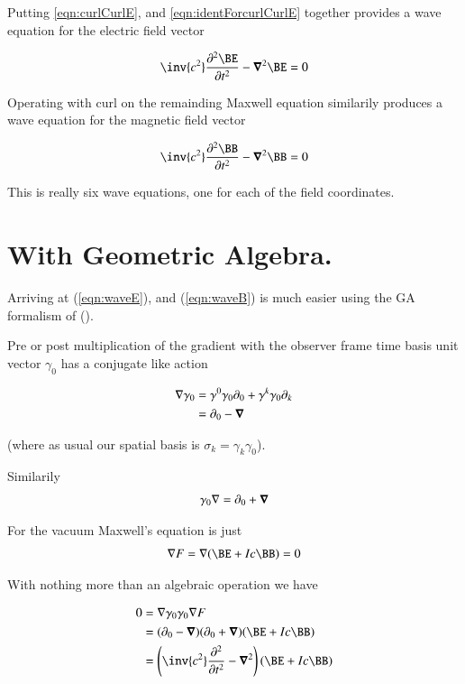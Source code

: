 \documentclass{article}
\begin{document}
Putting \ref{eqn:curlCurlE}, and \ref{eqn:identForcurlCurlE} together provides a wave equation for the electric field vector

\begin{align}\label{eqn:waveE}
\inv{c^2} \frac{\partial^2 \BE}{\partial t^2} - \spacegrad^2 \BE = 0
\end{align}

Operating with curl on the remainding Maxwell equation similarily produces a wave equation for the magnetic field vector

\begin{align}\label{eqn:waveB}
\inv{c^2} \frac{\partial^2 \BB}{\partial t^2} - \spacegrad^2 \BB = 0
\end{align}

This is really six wave equations, one for each of the field coordinates.

\section{With Geometric Algebra.}

Arriving at (\ref{eqn:waveE}), and (\ref{eqn:waveB}) is much easier using the GA formalism of (\cite{doran2003gap}).

Pre or post multiplication of the gradient with the observer frame time basis unit vector $\gamma_0$ has a conjugate like
action

\begin{align*}
\nabla \gamma_0
&=
\gamma^0 \gamma_0 \partial_0 + \gamma^k \gamma_0 \partial_k \\
&=
\partial_0 - \boldsymbol{\nabla} \\
\end{align*}

(where as usual our spatial basis is $\sigma_k = \gamma_k \gamma_0$).

Similarily
\begin{align*}
\gamma_0 \nabla 
&=
\partial_0 + \boldsymbol{\nabla} \\
\end{align*}

For the vacuum Maxwell's equation is just
\begin{align*}
\grad F = \grad (\BE + I c \BB) = 0
\end{align*}

With nothing more than an algebraic operation we have

\begin{align*}
0 
&= \grad \gamma_0 \gamma_0 \grad F \\
&=
( \partial_0 - \spacegrad ) ( \partial_0 + \spacegrad ) (\BE + I c \BB) \\
&=
\left( \inv{c^2} \frac{\partial^2}{\partial t^2} - \spacegrad^2 \right) (\BE + I c \BB) \\
\end{align*}
\end{document}
